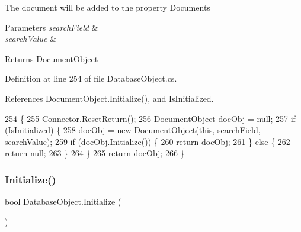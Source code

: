 The document will be added to the property \textquotesingle{}Documents\textquotesingle{}


\begin{DoxyParams}{Parameters}
{\em search\+Field} & \\
\hline
{\em search\+Value} & \\
\hline
\end{DoxyParams}
\begin{DoxyReturn}{Returns}
\mbox{\hyperlink{class_document_object}{Document\+Object}}
\end{DoxyReturn}


Definition at line 254 of file Database\+Object.\+cs.



References Document\+Object.\+Initialize(), and Is\+Initialized.


\begin{DoxyCode}
254                                                                                    \{
255         \mbox{\hyperlink{class_connector}{Connector}}.ResetReturn();
256         \mbox{\hyperlink{class_document_object}{DocumentObject}} docObj = null;
257         \textcolor{keywordflow}{if} (\mbox{\hyperlink{class_database_object_a5fe036d32a30eb10d1b3f6a30263f740}{IsInitialized}}) \{
258             docObj = \textcolor{keyword}{new} \mbox{\hyperlink{class_document_object}{DocumentObject}}(\textcolor{keyword}{this}, searchField, searchValue);
259             \textcolor{keywordflow}{if} (docObj.\mbox{\hyperlink{class_document_object_af4298d6cfbb9ea60643d9995309b73f1}{Initialize}}()) \{
260                 \textcolor{keywordflow}{return} docObj;
261             \} \textcolor{keywordflow}{else} \{
262                 \textcolor{keywordflow}{return} null;
263             \}
264         \}
265         \textcolor{keywordflow}{return} docObj;
266     \}
\end{DoxyCode}
\mbox{\label{class_database_object_a7de43a21bd287deec537cffec343f41d}} 
\subsubsection{\texorpdfstring{Initialize()}{Initialize()}}
{\footnotesize\ttfamily bool Database\+Object.\+Initialize (\begin{DoxyParamCaption}{ }\end{DoxyParamCaption})}



